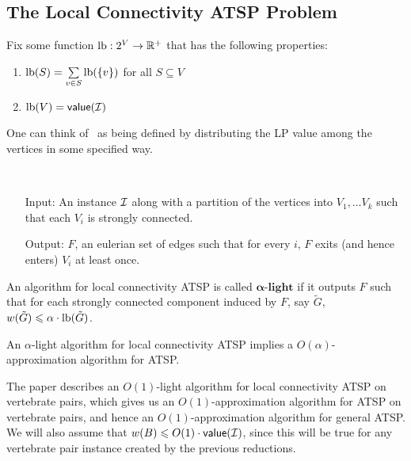 \documentclass[./main.tex]{subfiles}
\begin{document}
	\subsection{The Local Connectivity ATSP Problem}
		Fix some function $\textup{lb} : 2^V\rightarrow \mathbb{R}^+$ that has the following properties:
		\begin{enumerate}
			\item $\textup{lb}(S) = \sum\limits_{v\in S}\textup{lb}(\{v\})$ for all $S\subseteq V$
			\item $\textup{lb}(V) = \textsf{\textup{value}}(\mathcal{I})$
		\end{enumerate}
		One can think of \lb\ as being defined by distributing the LP value among the vertices in some specified way.\\

		\begin{problem}\
			\begin{itemize}
				\item[Input:]
					An instance $\mathcal{I}$ along with a partition of the vertices into $V_1, \dots V_k$ such that each $V_i$ is strongly connected.
				\item[Output:] $F$, an eulerian set of edges such that for every $i$, $F$ exits (and hence enters) $V_i$ at least once.\\
			\end{itemize}
		\end{problem}

		\begin{definition}
			An algorithm for local connectivity ATSP is called $\bm{\alpha}\textbf{-light}$ if it outputs $F$ such that for each strongly connected component induced by $F$, say $\tilde{G}$, $w(\tilde{G})\leqslant \alpha\cdot \textup{lb}(\tilde{G})$.\\
		\end{definition}

		\begin{theorem}[Svensson '15]
			An $\alpha$-light algorithm for local connectivity ATSP implies a $O(\alpha)$-approximation algorithm for ATSP.
		\end{theorem}

		The paper describes an $O(1)$-light algorithm for local connectivity ATSP on vertebrate pairs, which gives us an $O(1)$-approximation algorithm for ATSP on vertebrate pairs, and hence an $O(1)$-approximation algorithm for general ATSP.\\
		We will also assume that $w(B)\leqslant O(1)\cdot \textsf{\textup{value}}(\mathcal{I})$, since this will be true for any vertebrate pair instance created by the previous reductions.\\
\end{document}
